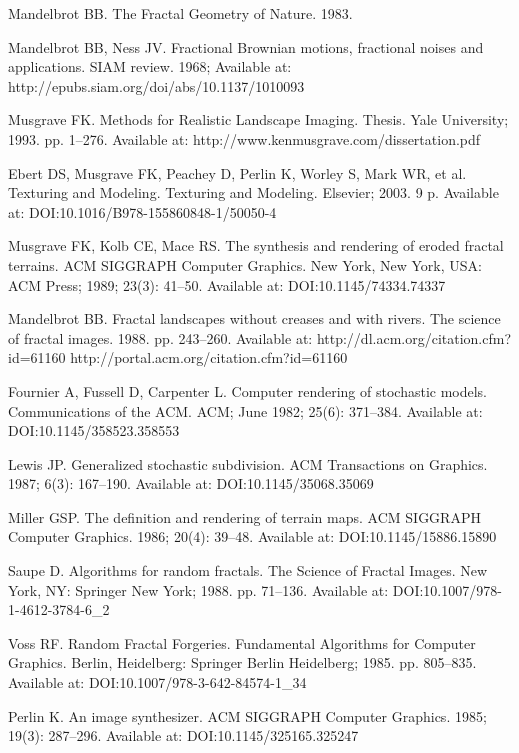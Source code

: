 Mandelbrot BB. The Fractal Geometry of Nature. 1983.

Mandelbrot BB, Ness JV. Fractional Brownian motions, fractional noises and applications. SIAM review. 1968; Available at: http://epubs.siam.org/doi/abs/10.1137/1010093

Musgrave FK. Methods for Realistic Landscape Imaging. Thesis. Yale University; 1993. pp. 1--276. Available at: http://www.kenmusgrave.com/dissertation.pdf

Ebert DS, Musgrave FK, Peachey D, Perlin K, Worley S, Mark WR, et al. Texturing and Modeling. Texturing and Modeling. Elsevier; 2003. 9 p. Available at: DOI:10.1016/B978-155860848-1/50050-4

Musgrave FK, Kolb CE, Mace RS. The synthesis and rendering of eroded fractal terrains. ACM SIGGRAPH Computer Graphics. New York, New York, USA: ACM Press; 1989; 23(3): 41--50. Available at: DOI:10.1145/74334.74337

Mandelbrot BB. Fractal landscapes without creases and with rivers. The science of fractal images. 1988. pp. 243--260. Available at: http://dl.acm.org/citation.cfm?id=61160 http://portal.acm.org/citation.cfm?id=61160

Fournier A, Fussell D, Carpenter L. Computer rendering of stochastic models. Communications of the ACM. ACM; June 1982; 25(6): 371--384. Available at: DOI:10.1145/358523.358553

Lewis JP. Generalized stochastic subdivision. ACM Transactions on Graphics. 1987; 6(3): 167--190. Available at: DOI:10.1145/35068.35069

Miller GSP. The definition and rendering of terrain maps. ACM SIGGRAPH Computer Graphics. 1986; 20(4): 39--48. Available at: DOI:10.1145/15886.15890

Saupe D. Algorithms for random fractals. The Science of Fractal Images. New York, NY: Springer New York; 1988. pp. 71--136. Available at: DOI:10.1007/978-1-4612-3784-6\_2

Voss RF. Random Fractal Forgeries. Fundamental Algorithms for Computer Graphics. Berlin, Heidelberg: Springer Berlin Heidelberg; 1985. pp. 805--835. Available at: DOI:10.1007/978-3-642-84574-1\_34

Perlin K. An image synthesizer. ACM SIGGRAPH Computer Graphics. 1985; 19(3): 287--296. Available at: DOI:10.1145/325165.325247

